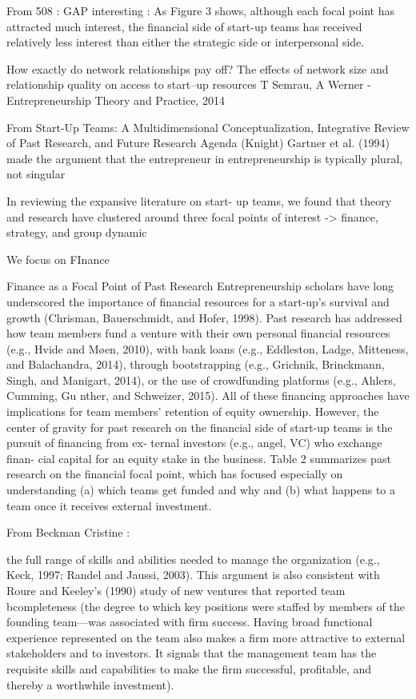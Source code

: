 \documentclass[12pt]{article}
\begin{document}
From 508 : GAP interesting : As Figure 3 shows, although each focal point has attracted much interest, the financial side of start-up teams has received relatively less interest than either the strategic side or interpersonal side.

How exactly do network relationships pay off? The effects of network size and relationship quality on access to start–up resources
T Semrau, A Werner - Entrepreneurship Theory and Practice, 2014

From Start-Up Teams: A Multidimensional Conceptualization, Integrative Review of Past Research, and Future Research Agenda (Knight)
Gartner et al. (1994) made the argument that the entrepreneur in entrepreneurship is typically plural, not singular

In reviewing the expansive literature on start- up teams, we found that theory and research have clustered around three focal points of interest -> finance, strategy, and group dynamic

We focus on FInance

Finance as a Focal Point of Past Research
Entrepreneurship scholars have long underscored the importance of financial resources for a start-up’s survival and growth (Chrisman, Bauerschmidt, and Hofer, 1998). Past research has addressed how team members fund a venture with their own personal financial resources (e.g., Hvide and Møen, 2010), with bank loans (e.g., Eddleston, Ladge, Mitteness, and Balachandra, 2014), through bootstrapping (e.g., Grichnik, Brinckmann, Singh, and Manigart, 2014), or the use of crowdfunding platforms (e.g., Ahlers, Cumming, Gu nther, and Schweizer, 2015). All of these financing approaches have implications for team members’ retention of equity ownership. However, the center of gravity for past research on the financial side of start-up teams is the pursuit of financing from ex- ternal investors (e.g., angel, VC) who exchange finan- cial capital for an equity stake in the business. Table 2 summarizes past research on the financial focal point, which has focused especially on understanding (a) which teams get funded and why and (b) what happens to a team once it receives external investment.

From Beckman Cristine :

the full range of skills and abilities needed to manage the organization (e.g., Keck, 1997; Randel and Jaussi, 2003). This argument is also consistent with Roure and Keeley’s (1990) study of new ventures that reported team bcompleteness (the degree to which key positions were staffed by members of the founding team—was associated with firm success. Having broad functional experience represented on the team also makes a firm more attractive to external stakeholders and to investors. It signals that the management team has the requisite skills and capabilities to make the firm successful, profitable, and thereby a worthwhile investment).
\end{document}
